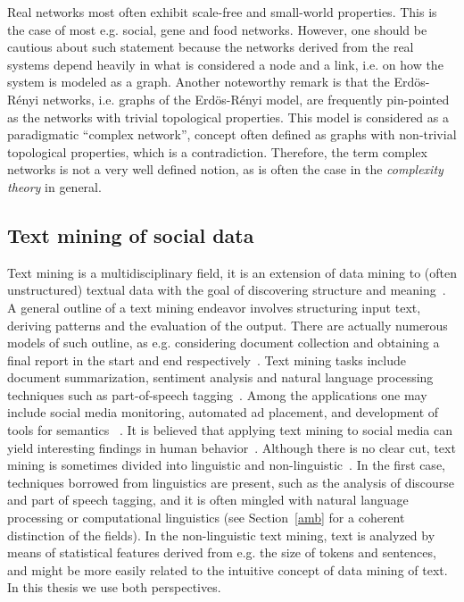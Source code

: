 Real networks most often exhibit scale-free and small-world properties.
This is the case of most e.g. social, gene and food networks.
However, one should be cautious about such statement because
the networks derived from the real systems depend heavily
in what is considered a node and a link,
i.e. on how the system is modeled as a graph.
Another noteworthy remark is that
the Erdös-Rényi networks, i.e. graphs of the Erdös-Rényi model, are frequently pin-pointed as the networks with trivial
topological properties.
This model is considered as a paradigmatic ``complex network'', concept often defined as graphs with non-trivial topological properties,
which is a contradiction. Therefore, the term complex networks is not a very well defined notion,
as is often the case in the \emph{complexity theory} in general.


\subsection{Text mining of social data}
Text mining is a multidisciplinary field,
it is an extension of data mining to (often unstructured) textual data
with the goal of discovering structure and meaning~\cite{customText}.
A general outline of a text mining endeavor involves structuring input text,
deriving patterns and the evaluation of the output.
There are actually numerous models of such outline,
as e.g. considering document collection and obtaining a final report in the
start and end respectively~\cite{textSurvey}.
Text mining tasks include document summarization, sentiment analysis
and natural language processing techniques such as part-of-speech tagging~\cite{ntlk}.
Among the applications one may include social media monitoring, automated ad placement, and development of tools for 
semantics ~\cite{textSurvey}.
It is believed that applying text mining to social media
can yield interesting findings in human behavior~\cite{customText}.
Although there is no clear cut, text mining is sometimes divided into linguistic and non-linguistic~\cite{customText}.
In the first case, techniques borrowed from linguistics are present, such as
the analysis of discourse and part of speech tagging,
and it is often mingled with natural language processing or computational linguistics (see Section~\ref{amb} for a coherent distinction of the fields).
In the non-linguistic text mining, text is analyzed by means of statistical features
derived from e.g. the size of tokens and sentences,
and might be more easily related to the intuitive concept of data mining of text.
In this thesis we use both perspectives.

